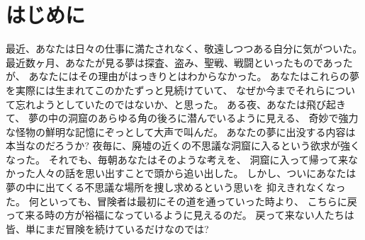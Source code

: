 \maketitle

\section{はじめに}


最近、あなたは日々の仕事に満たされなく、敬遠しつつある自分に気がついた。
最近数ヶ月、あなたが見る夢は探査、盗み、聖戦、戦闘といったものであったが、
あなたにはその理由がはっきりとはわからなかった。
あなたはこれらの夢を実際には生まれてこのかたずっと見続けていて、
なぜか今までそれらについて忘れようとしていたのではないか、と思った。
ある夜、あなたは飛び起きて、
夢の中の洞窟のあらゆる角の後ろに潜んでいるように見える、
奇妙で強力な怪物の鮮明な記憶にぞっとして大声で叫んだ。
あなたの夢に出没する内容は本当なのだろうか?
夜毎に、廃墟の近くの不思議な洞窟に入るという欲求が強くなった。
それでも、毎朝あなたはそのような考えを、
洞窟に入って帰って来なかった人々の話を思い出すことで頭から追い出した。
しかし、ついにあなたは夢の中に出てくる不思議な場所を捜し求めるという思いを
抑えきれなくなった。
何といっても、冒険者は最初にその道を通っていった時より、
こちらに戻って来る時の方が裕福になっているように見えるのだ。
戻って来ない人たちは皆、単にまだ冒険を続けているだけなのでは?

